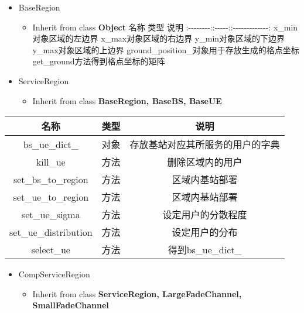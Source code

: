 \documentclass[11pt]{article}
\providecommand{\tightlist}{%
      \setlength{\itemsep}{0pt}\setlength{\parskip}{0pt}}
\begin{document}
\begin{itemize}
\tightlist
\item
  BaseRegion

  \begin{itemize}
  \tightlist
  \item
    Inherit from class \textbf{Object} \textbar{} 名称 \textbar{} 类型
    \textbar{} 说明 \textbar{}
    \textbar{}:-\/-\/-\/-\/-\/-\/-\/-:\textbar{}:-\/-\/-\/-\/-:\textbar{}:-\/-\/-\/-\/-\/-\/-\/-\/-\/-\/-\/-\/-:\textbar{}
    \textbar{}x\_min\textbar{}对象\textbar{}区域的左边界\textbar{}
    \textbar{}x\_max\textbar{}对象\textbar{}区域的右边界\textbar{}
    \textbar{}y\_min\textbar{}对象\textbar{}区域的下边界\textbar{}
    \textbar{}y\_max\textbar{}对象\textbar{}区域的上边界\textbar{}
    \textbar{}ground\_position\_\textbar{}对象\textbar{}用于存放生成的格点坐标\textbar{}
    \textbar{}get\_ground\textbar{}方法\textbar{}得到格点坐标的矩阵\textbar{}
  \end{itemize}
\item
  ServiceRegion

  \begin{itemize}
  \tightlist
  \item
    Inherit from class \textbf{BaseRegion, BaseBS, BaseUE}
  \end{itemize}
\end{itemize}

\begin{longtable}[c]{@{}ccc@{}}
\toprule
名称 & 类型 & 说明\tabularnewline
\midrule
\endhead
bs\_ue\_dict\_ & 对象 & 存放基站对应其所服务的用户的字典\tabularnewline
kill\_ue & 方法 & 删除区域内的用户\tabularnewline
set\_bs\_to\_region & 方法 & 区域内基站部署\tabularnewline
set\_ue\_to\_region & 方法 & 区域内基站部署\tabularnewline
set\_ue\_sigma & 方法 & 设定用户的分散程度\tabularnewline
set\_ue\_distribution & 方法 & 设定用户的分布\tabularnewline
select\_ue & 方法 & 得到bs\_ue\_dict\_\tabularnewline
\bottomrule
\end{longtable}

\begin{itemize}
\tightlist
\item
  CompServiceRegion

  \begin{itemize}
  \tightlist
  \item
    Inherit from class \textbf{ServiceRegion, LargeFadeChannel,
    SmallFadeChannel}
  \end{itemize}
\end{itemize}
\end{document}
